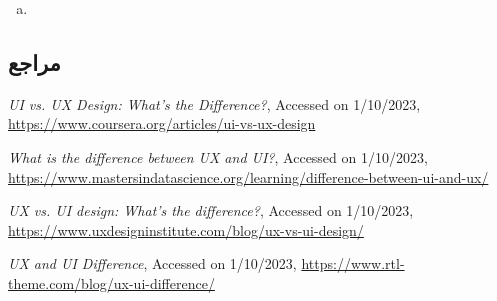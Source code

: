 {\begin{enumerate}[a)]
درنهایت باید تاکید کرد که رابط کاربری و تجربه‌ی کاربری مکمل یکدیگر هستند و هردو برای تولید یک محصول رضایت‌بخش ضروری‌اند و نمی‌توان یکی را به دیگری برتری داد.
	\item 

\end{enumerate}


\subsection*{مراجع}

\begin{latin}
	\begingroup
	\renewcommand{\section}[2]{}%
	
\begin{thebibliography}{9}
	\textit{UI vs. UX Design: What’s the Difference?},
	Accessed on 1/10/2023,
	\url{https://www.coursera.org/articles/ui-vs-ux-design}
	
	\textit{What is the difference between UX and UI?},
	Accessed on 1/10/2023,
	\url{https://www.mastersindatascience.org/learning/difference-between-ui-and-ux/}
	
	\textit{UX vs. UI design: What’s the difference?},
	Accessed on 1/10/2023,
	\url{https://www.uxdesigninstitute.com/blog/ux-vs-ui-design/}
	
	\textit{UX and UI Difference},
	Accessed on 1/10/2023,
	\url{https://www.rtl-theme.com/blog/ux-ui-difference/}
\end{thebibliography}
\endgroup
\end{latin}

}
